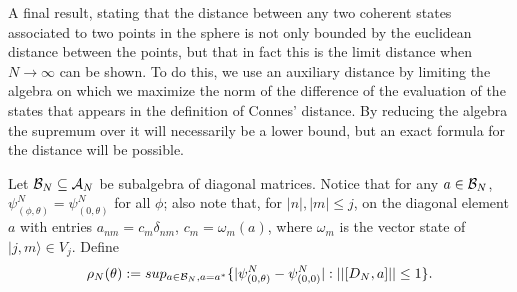 

 





A final result, stating that the distance between any two coherent states associated to two points in the sphere is not only bounded by the euclidean distance between the points, but that in fact this is the limit distance when $N \to \infty$ can be shown. To do this, we use an auxiliary distance by limiting the algebra on which we maximize the norm of the difference of the evaluation of the states that appears in the definition of Connes' distance. By reducing the algebra the supremum over it will necessarily be a lower bound, but an exact formula for the distance will be possible.

Let $\textcolor{black}{\mathcal B_N} \subseteq \mathcal A_N$ be subalgebra of diagonal matrices. Notice that for any $a \in \mathcal B_N$, $\psi^N_{(\phi, \theta)} = \psi^N_{(0, \theta)}$ for all $\phi$; also note that, for $|n|, |m| \leq j$, on the diagonal element $a$ with entries $a_{nm} = c_m \delta_{nm}$, $c_m = \omega_m(a)$, where $\omega_m$ is the vector state of $|j, m\rangle \in V_j$. Define
\begin{equation}
    \textcolor{black}{\rho_N}(\theta) := sup_{a \in \mathcal B_N, a = a^*}\{|\psi^N_{(0, \theta)} - \psi^N_{(0, 0)}| : ||[D_N, a]|| \leq 1\}.
\end{equation}

